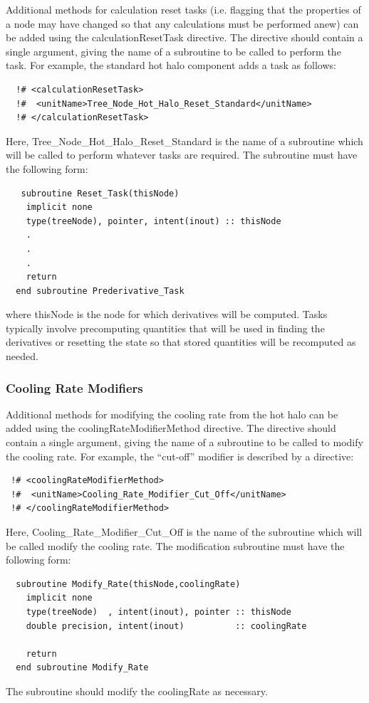 Additional methods for calculation reset tasks (i.e. flagging that the properties of a node may have changed so that any calculations must be performed anew) can be added using the {\normalfont \ttfamily calculationResetTask} directive. The directive should contain a single argument, giving the name of a subroutine to be called to perform the task. For example, the standard hot halo component adds a task as follows:
\begin{verbatim}
  !# <calculationResetTask>
  !#  <unitName>Tree_Node_Hot_Halo_Reset_Standard</unitName>
  !# </calculationResetTask>
\end{verbatim}
Here, {\normalfont \ttfamily Tree\_Node\_Hot\_Halo\_Reset\_Standard} is the name of a subroutine which will be called to perform whatever tasks are required. The subroutine must have the following form:
\begin{verbatim}
   subroutine Reset_Task(thisNode)
    implicit none
    type(treeNode), pointer, intent(inout) :: thisNode
    .
    .
    .
    return
  end subroutine Prederivative_Task
\end{verbatim}
where {\normalfont \ttfamily thisNode} is the node for which derivatives will be computed. Tasks typically involve precomputing quantities that will be used in finding the derivatives or resetting the state so that stored quantities will be recomputed as needed.

\subsubsection{Cooling Rate Modifiers}

Additional methods for modifying the cooling rate from the hot halo can be added using the {\normalfont \ttfamily coolingRateModifierMethod} directive. The directive should contain a single argument, giving the name of a subroutine to be called to modify the cooling rate. For example, the ``cut-off'' modifier is described by a directive:
\begin{verbatim}
 !# <coolingRateModifierMethod>
 !#  <unitName>Cooling_Rate_Modifier_Cut_Off</unitName>
 !# </coolingRateModifierMethod>
\end{verbatim}
Here, {\normalfont \ttfamily Cooling\_Rate\_Modifier\_Cut\_Off} is the name of the subroutine which will be called modify the cooling rate. The modification subroutine must have the following form:
\begin{verbatim}
  subroutine Modify_Rate(thisNode,coolingRate)
    implicit none
    type(treeNode)  , intent(inout), pointer :: thisNode
    double precision, intent(inout)          :: coolingRate    

    return
  end subroutine Modify_Rate
\end{verbatim}
The subroutine should modify the {\normalfont \ttfamily coolingRate} as necessary.

